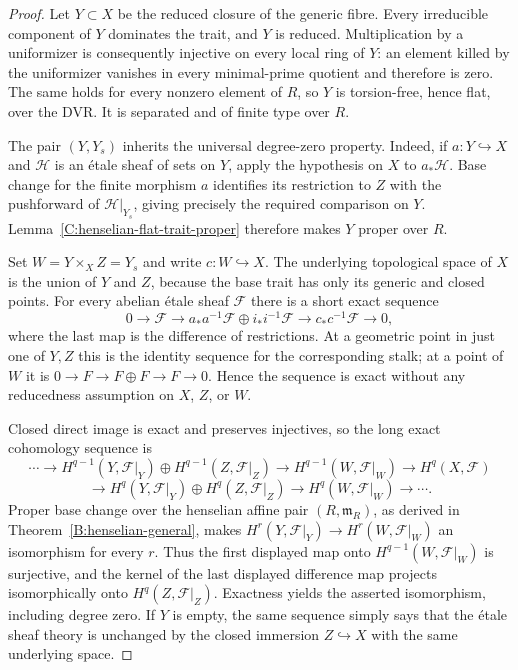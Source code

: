 \begin{proof}
Let $Y\subset X$ be the reduced closure of the generic fibre.
Every irreducible component of $Y$ dominates the trait, and $Y$ is
reduced. Multiplication by a uniformizer is consequently injective
on every local ring of $Y$: an element killed by the uniformizer
vanishes in every minimal-prime quotient and therefore is zero.
The same holds for every nonzero element of $R$, so $Y$ is
torsion-free, hence flat, over the DVR. It is separated and of
finite type over $R$.

The pair $(Y,Y_s)$ inherits the universal degree-zero property.
Indeed, if $a:Y\hookrightarrow X$ and $\mathcal H$ is an \'etale
sheaf of sets on $Y$, apply the hypothesis on $X$ to $a_*\mathcal H$.
Base change for the finite morphism $a$ identifies its restriction
to $Z$ with the pushforward of $\mathcal H|_{Y_s}$, giving precisely
the required comparison on $Y$. Lemma~\ref{C:henselian-flat-trait-proper}
therefore makes $Y$ proper over $R$.

Set $W=Y\times_X Z=Y_s$ and write $c:W\hookrightarrow X$.
The underlying topological space of $X$ is the union of $Y$ and $Z$,
because the base trait has only its generic and closed points.
For every abelian \'etale sheaf $\mathcal F$ there is a short exact
sequence
\[
 0\longrightarrow\mathcal F
 \longrightarrow a_*a^{-1}\mathcal F\oplus i_*i^{-1}\mathcal F
 \longrightarrow c_*c^{-1}\mathcal F\longrightarrow0,
\]
where the last map is the difference of restrictions. At a geometric
point in just one of $Y,Z$ this is the identity sequence for the
corresponding stalk; at a point of $W$ it is
$0\to F\to F\oplus F\to F\to0$. Hence the sequence is exact
without any reducedness assumption on $X$, $Z$, or $W$.

Closed direct image is exact and preserves injectives, so the long
exact cohomology sequence is
\[
 \cdots\longrightarrow H^{q-1}(Y,\mathcal F|_Y)
       \oplus H^{q-1}(Z,\mathcal F|_Z)
 \longrightarrow H^{q-1}(W,\mathcal F|_W)
 \longrightarrow H^q(X,\mathcal F)
\]
\[
 \longrightarrow H^q(Y,\mathcal F|_Y)\oplus H^q(Z,\mathcal F|_Z)
 \longrightarrow H^q(W,\mathcal F|_W)\longrightarrow\cdots.
\]
Proper base change over the henselian affine pair $(R,\mathfrak m_R)$,
as derived in Theorem~\ref{B:henselian-general}, makes
$H^r(Y,\mathcal F|_Y)\to H^r(W,\mathcal F|_W)$ an isomorphism for
every $r$. Thus the first displayed map onto $H^{q-1}(W,\mathcal F|_W)$
is surjective, and the kernel of the last displayed difference map
projects isomorphically onto $H^q(Z,\mathcal F|_Z)$. Exactness yields
the asserted isomorphism, including degree zero. If $Y$ is empty,
the same sequence simply says that the étale sheaf theory is
unchanged by the closed immersion $Z\hookrightarrow X$ with the
same underlying space.
\end{proof}

